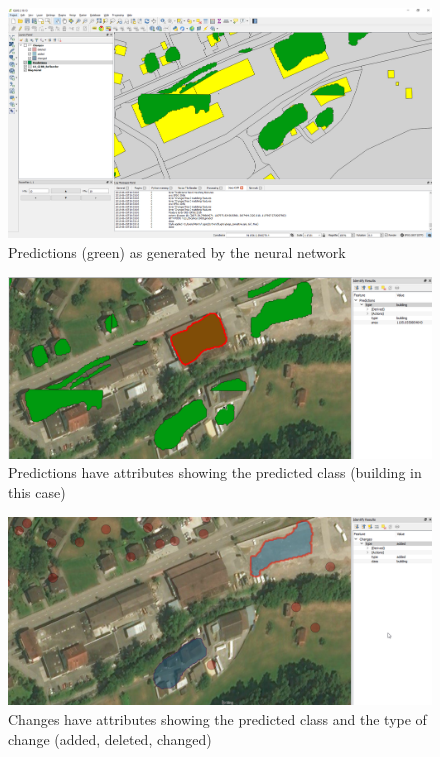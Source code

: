 \begin{figure}[H]
    \centering
	\includegraphics[width=1\linewidth]{chapters/practical_results/images/qgis_predictions.png}
	\caption{Predictions (green) as generated by the neural network}
	\label{fig:plugin:predictions}
\end{figure}

\begin{figure}[H]
    \centering
	\includegraphics[width=1\linewidth]{chapters/practical_results/images/qgis_prediction_attributes.png}
	\caption{Predictions have attributes showing the predicted class (building in this case)}
	\label{fig:plugin:prediction_attributes}
\end{figure}

\begin{figure}[H]
    \centering
	\includegraphics[width=1\linewidth]{chapters/practical_results/images/qgis_changes_attributes.png}
	\caption{Changes have attributes showing the predicted class and the type of change (added, deleted, changed)}
	\label{fig:plugin:change_attributes}
\end{figure}


